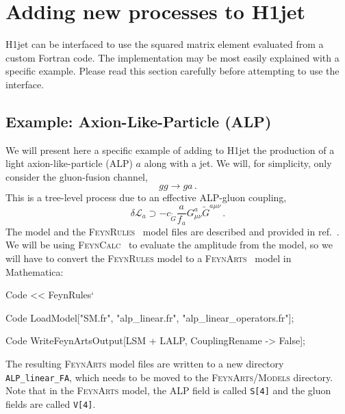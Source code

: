 \documentclass[12pt,a4wide]{article}
\begin{document}
\newpage 

\section{Adding new processes to H1jet} \label{sec:newprocs} 
H1jet can be interfaced to use the squared matrix element evaluated from a custom Fortran code. The implementation may be most easily explained with a specific example. Please read this section carefully before attempting to use the interface. 

\subsection{Example: Axion-Like-Particle (ALP)}
We will present here a specific example of adding to H1jet the production of a light axion-like-particle (ALP) $a$ along with a jet. We will, for simplicity, only consider the gluon-fusion channel, 
\begin{equation}
    g g \rightarrow g a \,. 
\end{equation}
This is a tree-level process due to an effective ALP-gluon coupling, 
\begin{equation}
   \delta \mathcal{L}_a \supset -c_{\tilde{G}}\frac{a}{f_a} G_{\mu\nu}^{a} \tilde{G}^{a \mu\nu} \,. \label{eq:ggacoupling}
\end{equation}
The model and the \textsc{FeynRules}~\cite{Alloul:2013bka} model files
are described and provided in ref.~\cite{Brivio:2017ije}. We will be
using \textsc{FeynCalc}~\cite{Mertig:1990an,Shtabovenko:2016sxi,Shtabovenko:2020gxv} to evaluate the amplitude from
the model, so we will have to convert the \textsc{FeynRules} model to
a \textsc{FeynArts}~\cite{Hahn:2000kx} model in Mathematica:
\begin{mmaCell}{Code}
<< FeynRules` 
\end{mmaCell}
\begin{mmaCell}{Code}
LoadModel["SM.fr", "alp_linear.fr", "alp_linear_operators.fr"];  
\end{mmaCell}
\begin{mmaCell}{Code}
WriteFeynArtsOutput[LSM + LALP, CouplingRename -> False]; 
\end{mmaCell}
The resulting \textsc{FeynArts} model files are written to a new directory \texttt{ALP\_linear\_FA}, which needs to be moved to the \textsc{FeynArts/Models} directory. Note that in the \textsc{FeynArts} model, the ALP field is called \texttt{S[4]} and the gluon fields are called \texttt{V[4]}. 
\end{document}
